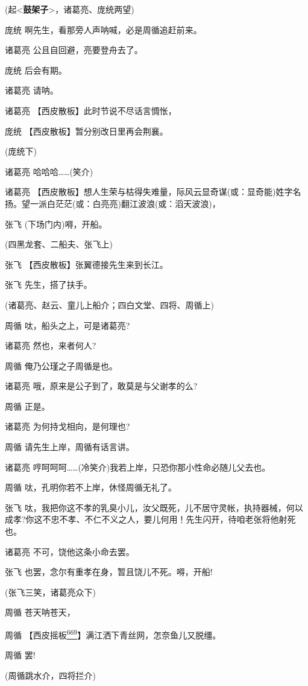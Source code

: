 (起\textless{}\textbf{鼓架子}\textgreater{}，诸葛亮、庞统两望)

庞统 啊先生，看那旁人声呐喊，必是周循追赶前来。

诸葛亮 公且自回避，亮要登舟去了。

庞统 后会有期。

诸葛亮 请呐。

诸葛亮 【西皮散板】此时节说不尽话言惆怅，

庞统 【西皮散板】暂分别改日里再会荆襄。

(庞统下)

诸葛亮 哈哈哈\ldots{}\ldots{}(笑介)

诸葛亮
【西皮散板】想人生荣与枯得失难量，际风云{显奇谋}(或：显奇能)姓字名扬。望一派{白茫茫}(或：白亮亮){翻江波浪}(或：滔天波浪)，

张飞 (下场门内)嘚，开船。

(四黑龙套、二船夫、张飞上)

张飞 【西皮散板】张翼德接先生来到长江。

张飞 先生，搭了扶手。

(诸葛亮、赵云、童儿上船介；四白文堂、四将、周循上)

周循 呔，船头之上，可是诸葛亮?

诸葛亮 然也，来者何人?

周循 俺乃公瑾之子周循是也。

诸葛亮 哦，原来是公子到了，敢莫是与父谢孝的么?

周循 正是。

诸葛亮 为何持戈相向，是何理也?

周循 请先生上岸，周循有话言讲。

诸葛亮
哼呵呵呵\ldots{}\ldots{}(冷笑介)我若上岸，只恐你那小性命必随儿父去也。

周循 呔，孔明你若不上岸，休怪周循无礼了。

张飞
呔，我把你这不孝的乳臭小儿，汝父既死，儿不居守灵帐，执持器械，何以成孝?你这不忠不孝、不仁不义之人，要儿何用！先生闪开，待咱老张将他射死也。

诸葛亮 不可，饶他这条小命去罢。

张飞 也罢，念尔有重孝在身，暂且饶儿不死。嘚，开船!

(张飞三笑，诸葛亮众下)

周循 苍天呐苍天，

周循
【西皮摇板\protect\hyperlink{fn669}{\textsuperscript{669}}】满江洒下青丝网，怎奈鱼儿又脱缰。

周循 罢!

(周循跳水介，四将拦介)

